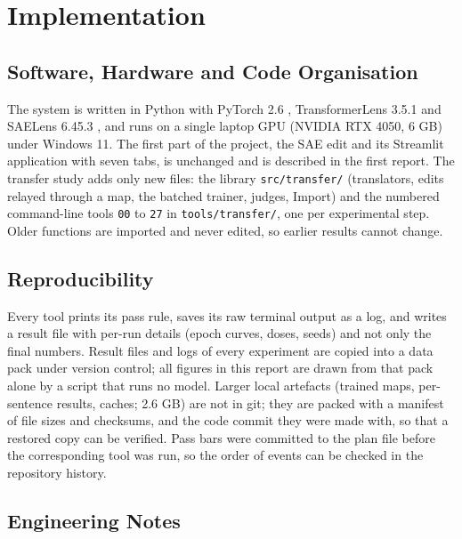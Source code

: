 \chapter{Implementation}\label{ch:implementation}

\section{Software, Hardware and Code Organisation}

The system is written in Python with PyTorch 2.6 \cite{r22}, TransformerLens 3.5.1 \cite{r13} and SAELens 6.45.3 \cite{r14}, and runs on a single laptop GPU (NVIDIA RTX 4050, 6 GB) under Windows 11. The first part of the project, the SAE edit and its Streamlit application with seven tabs, is unchanged and is described in the first report. The transfer study adds only new files: the library \texttt{src/transfer/} (translators, edits relayed through a map, the batched trainer, judges, Import) and the numbered command-line tools \texttt{00} to \texttt{27} in \texttt{tools/transfer/}, one per experimental step. Older functions are imported and never edited, so earlier results cannot change.

\section{Reproducibility}

Every tool prints its pass rule, saves its raw terminal output as a log, and writes a result file with per-run details (epoch curves, doses, seeds) and not only the final numbers. Result files and logs of every experiment are copied into a data pack under version control; all figures in this report are drawn from that pack alone by a script that runs no model. Larger local artefacts (trained maps, per-sentence results, caches; 2.6 GB) are not in git; they are packed with a manifest of file sizes and checksums, and the code commit they were made with, so that a restored copy can be verified. Pass bars were committed to the plan file before the corresponding tool was run, so the order of events can be checked in the repository history.

\section{Engineering Notes}


